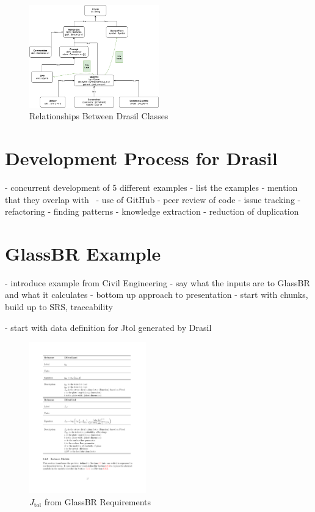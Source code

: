 \documentclass[sigconf]{acmart}
\begin{document}
\begin{figure}[htpb]
\centering
\includegraphics[width=0.5\textwidth]{figures/class_hierarchy.png}
\caption{Relationships Between Drasil Classes}
\label{element}
\end{figure}

\section{Development Process for Drasil} \label{SecDevProcess}

- concurrent development of 5 different examples - list the examples - mention
that they overlap with~\cite{SmithJegatheesanAndKelly2016}
- use of GitHub
- peer review of code
- issue tracking
- refactoring - finding patterns
- knowledge extraction
- reduction of duplication

\section{GlassBR Example} \label{SecGlassBR}

- introduce example from Civil Engineering - say what the inputs are to GlassBR
and what it calculates
- bottom up approach to presentation - start with chunks, build up to SRS, traceability

- start with data definition for Jtol generated by Drasil

\begin{figure}[htpb]
\begin{center}
\includegraphics[width=0.45\textwidth]{./figures/Jtol_pdf.pdf}
\end{center}
\caption{$J_{\mbox{tol}}$ from GlassBR Requirements}
\label{Fig_Jtolpdf}
\end{figure}
\end{document}

